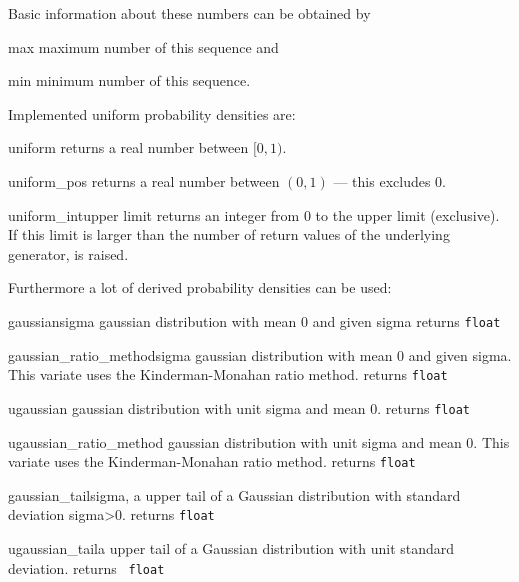 Basic information about these numbers can be obtained by
\begin{methoddesc}{max}{}
  maximum number of this sequence and
\end{methoddesc}
\begin{methoddesc}{min}{}
  minimum number of this sequence.
\end{methoddesc}
Implemented uniform probability densities are:
\begin{methoddesc}{uniform}{}
  returns a real number between $[0,1)$.
\end{methoddesc}
\begin{methoddesc}{uniform_pos}{}
  returns a real number between $(0,1)$ --- this excludes 0.
\end{methoddesc}
\begin{methoddesc}{uniform_int}{upper limit}
  returns an integer from 0 to the upper limit (exclusive). If this limit is larger than
  the number of return values of the underlying generator,  is
  raised.
\end{methoddesc}
Furthermore a lot of derived probability densities can be used:
\begin{methoddesc}{gaussian}{sigma}
  gaussian distribution with mean 0 and given sigma \hfill returns {\tt float}
\end{methoddesc}
\begin{methoddesc}{gaussian\_ratio\_method}{sigma}
  gaussian distribution with mean 0 and given sigma.  This variate uses the
  Kinderman-Monahan ratio method.  \hfill returns {\tt float}
\end{methoddesc}
\begin{methoddesc}{ugaussian}{}
  gaussian distribution with unit sigma and mean 0.  \hfill returns {\tt float}
\end{methoddesc}
\begin{methoddesc}{ugaussian\_ratio\_method}{}
  gaussian distribution with unit sigma and mean 0.  This variate uses the
  Kinderman-Monahan ratio method.  \hfill returns {\tt float}
\end{methoddesc}
\begin{methoddesc}{gaussian\_tail}{sigma, a}
  upper tail of a Gaussian distribution with standard deviation sigma>0.  \hfill returns
  {\tt float}
\end{methoddesc}
\begin{methoddesc}{ugaussian\_tail}{a}
  upper tail of a Gaussian distribution with unit standard deviation.  \hfill returns {\tt
    float}
\end{methoddesc}

